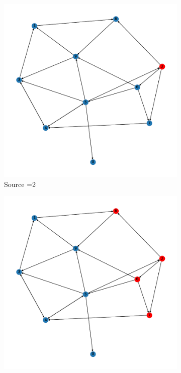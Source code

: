 \documentclass{article}
\begin{document}
\begin{problem}
\begin{figure}[!h]
\end{figure}

\begin{figure}[!h]
    \centering
    \begin{subfigure}{0.2\textwidth}
        \includegraphics[width=\textwidth]{./img/P1_3/frame0.png}
        \caption{Source =2}
    \end{subfigure}
    \begin{subfigure}{0.2\textwidth}
        \includegraphics[width=\textwidth]{./img/P1_3/frame1.png}

\end{subfigure}
\end{figure}
\end{problem}
\end{document}
